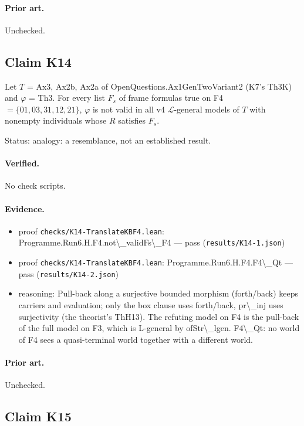 \documentclass{article}
\begin{document}
\paragraph{Prior art.} Unchecked.

\subsection*{Claim K14}

Let $T$ = Ax3, Ax2b, Ax2a of OpenQuestions.Ax1GenTwoVariant2 (K7's Th3K) and $\varphi$ = Th3. For every list $F_s$ of frame formulas true on F4 $=\{01,03,31,12,21\}$, $\varphi$ is not valid in all v4 $\mathcal L$-general models of $T$ with nonempty individuals whose $R$ satisfies $F_s$.

Status: analogy: a resemblance, not an established result.

\paragraph{Verified.}
No check scripts.

\paragraph{Evidence.}
\begin{itemize}
\item proof \texttt{checks/K14-TranslateKBF4.lean}: Programme.Run6.H.F4.not\textbackslash{}\_validFs\textbackslash{}\_F4 --- pass (\texttt{results/K14-1.json})
\item proof \texttt{checks/K14-TranslateKBF4.lean}: Programme.Run6.H.F4.F4\textbackslash{}\_Qt --- pass (\texttt{results/K14-2.json})
\item reasoning: Pull-back along a surjective bounded morphism (forth/back) keeps carriers and evaluation; only the box clause uses forth/back, pr\textbackslash{}\_inj uses surjectivity (the theorist's ThH13). The refuting model on F4 is the pull-back of the full model on F3, which is L-general by ofStr\textbackslash{}\_lgen. F4\textbackslash{}\_Qt: no world of F4 sees a quasi-terminal world together with a different world.
\end{itemize}

\paragraph{Prior art.} Unchecked.

\subsection*{Claim K15}
\end{document}
